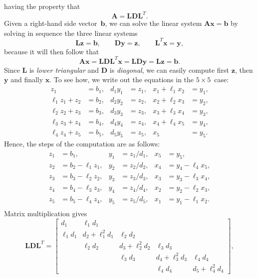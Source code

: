 having the property that
\begin{equation}\label{eq: L D LT}
\boldsymbol{A}=\boldsymbol{L}\boldsymbol{D}\boldsymbol{L}^T.
\end{equation}
Given a right-hand side vector~$\boldsymbol{b}$, we can solve the linear system
$\boldsymbol{A}\boldsymbol{x}=\boldsymbol{b}$ by solving in sequence the three
linear systems
\begin{equation}\label{eq: LDLT systems}
\boldsymbol{L}\boldsymbol{z}=\boldsymbol{b},\qquad
\boldsymbol{D}\boldsymbol{y}=\boldsymbol{z},\qquad
\boldsymbol{L}^T\boldsymbol{x}=\boldsymbol{y},
\end{equation}
because it will then follow that
\[
\boldsymbol{A}\boldsymbol{x}
    =\boldsymbol{L}\boldsymbol{D}\boldsymbol{L}^T\boldsymbol{x}
    =\boldsymbol{L}\boldsymbol{D}\boldsymbol{y}
    =\boldsymbol{L}\boldsymbol{z}=\boldsymbol{b}.
\]
Since $\boldsymbol{L}$ is \emph{lower triangular} and $\boldsymbol{D}$ is 
\emph{diagonal}, we can easily compute first $\boldsymbol{z}$, then 
$\boldsymbol{y}$ and finally $\boldsymbol{x}$.  To see how, we write out the 
equations in the $5\times5$~case:
\begin{align*}
      z_1    &=b_1,& d_1y_1&=z_1,& x_1+\ell_1 x_2&=y_1,\\
\ell_1z_1+z_2&=b_2,& d_2y_2&=z_2,& x_2+\ell_2 x_3&=y_2,\\
\ell_2z_2+z_3&=b_3,& d_3y_3&=z_3,& x_3+\ell_3 x_4&=y_3,\\
\ell_3z_3+z_4&=b_4,& d_4y_4&=z_4,& x_4+\ell_4 x_5&=y_4,\\
\ell_4z_4+z_5&=b_5,& d_5y_5&=z_5,& x_5           &=y_5.
\end{align*}
Hence, the steps of the computation are as follows:
\begin{align*}
z_1&=b_1,           & y_1&=z_1/d_1,& x_5&=y_5,\\
z_2&=b_2-\ell_1 z_1,& y_2&=z_2/d_2,& x_4&=y_4-\ell_4x_5,\\
z_3&=b_3-\ell_2 z_2,& y_3&=z_3/d_3,& x_3&=y_3-\ell_3x_4,\\
z_4&=b_4-\ell_3 z_3,& y_4&=z_4/d_4,& x_2&=y_2-\ell_2x_3,\\
z_5&=b_5-\ell_4 z_4,& y_5&=z_5/d_5,& x_1&=y_1-\ell_1x_2.\\
\end{align*}
Matrix multiplication gives
\[
\boldsymbol{L}\boldsymbol{D}\boldsymbol{L}^T=\begin{bmatrix}
      d_1&      \ell_1d_1&               &               &         \\
\ell_1d_1&d_2+\ell_1^2d_1&      \ell_2d_2&               &         \\
         &      \ell_2d_2&d_3+\ell_2^2d_2&      \ell_3d_3&         \\
         &               &      \ell_3d_3&d_4+\ell_3^2d_3&\ell_4d_4\\
         &               &               &      \ell_4d_4&d_5+\ell_4^2d_4
\end{bmatrix},
\]
